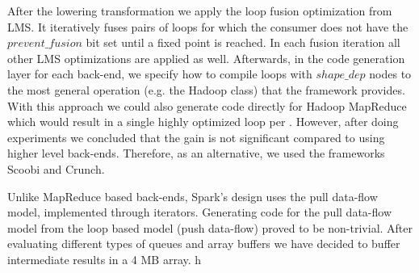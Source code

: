 After the lowering transformation we apply the loop fusion optimization from
LMS. It iteratively fuses pairs of loops for which the consumer does not have
the $prevent\_fusion$ bit set until a fixed point is reached. In each fusion
iteration all other LMS optimizations are applied as well. Afterwards, in the
code generation layer for each back-end, we specify how to compile loops with
$shape\_dep$ nodes to the most general operation (e.g. the Hadoop 
class) that the framework provides. With this approach we could also generate
code directly for Hadoop MapReduce which would result in a single highly
optimized loop per . However, after doing experiments we concluded
that the gain is not significant compared to using higher level back-ends.
Therefore, as an alternative, we used the frameworks Scoobi and Crunch.


Unlike MapReduce based back-ends, Spark's design uses the pull data-flow model,
implemented through iterators. Generating code for the pull data-flow model from
the loop based model (push data-flow) proved to be non-trivial. After evaluating
different types of queues and array buffers we have decided to buffer
intermediate results in a 4 MB array.
h